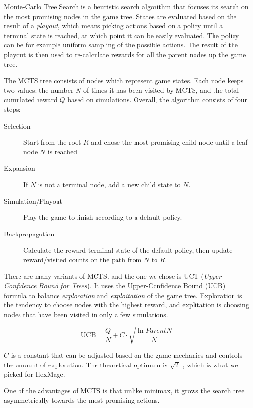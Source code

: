 Monte-Carlo Tree Search \citep{mcts-survey} is a heuristic search algorithm that focuses its search on the most
promising nodes in the game tree. States are evaluated based on the result of a \emph{playout}, which
means picking actions based on a policy until a terminal state is reached, at which point it can be easily
evaluated. The policy can be for example uniform sampling of the possible actions. The result
of the playout is then used to re-calculate rewards for all the parent nodes up the game tree.

The MCTS tree consists of nodes which represent game states. Each node keeps two values: the number $N$ of times
it has been visited by MCTS, and the total cumulated reward $Q$ based on simulations. Overall, the algorithm consists of four steps:

\begin{description}
	\item[Selection] Start from the root $R$ and chose the most promising child node until a leaf node $N$ is reached.
	\item[Expansion] If $N$ is not a terminal node, add a new child state to $N$.
	\item[Simulation/Playout] Play the game to finish according to a default policy.
	\item[Backpropagation] Calculate the reward terminal state of the default policy, then update reward/visited counts on the path from $N$ to $R$.
\end{description}

There are many variants of MCTS, and the one we chose is UCT (\emph{Upper Confidence Bound for Trees}). It uses the Upper-Confidence Bound (UCB) formula to balance \emph{exploration} and \emph{exploitation} of the game tree. Exploration is the tendency to choose nodes with the highest reward, and explitation is choosing nodes that have been visited in only a few simulations.

\begin{equation}
	\text{UCB} = \frac{Q}{N} + C \cdot \sqrt{\frac{\ln ParentN}{N}}	
\end{equation}

$C$ is a constant that can be adjusted based on the game mechanics and controls the amount of exploration. The theoretical optimum is $\sqrt{2}$ \citep{mcts-survey}, which is what we picked for HexMage.

One of the advantages of MCTS is that unlike minimax, it grows the search tree asymmetrically towards
the most promising actions.

